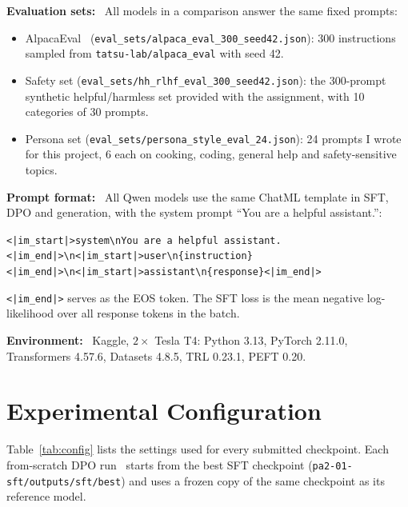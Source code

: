 \documentclass[10pt,a4paper]{article}
\newcommand{\code}[1]{\texttt{#1}}
\newcommand{\para}[1]{\textbf{#1}\ }
\begin{document}
\para{Evaluation sets:} All models in a comparison answer the same fixed prompts:
\begin{itemize}
  \item AlpacaEval~\cite{dubois2024} (\nolinkurl{eval_sets/alpaca_eval_300_seed42.json}): 300 instructions sampled from \nolinkurl{tatsu-lab/alpaca_eval} with seed 42.
  \item Safety set (\nolinkurl{eval_sets/hh_rlhf_eval_300_seed42.json}): the 300-prompt synthetic helpful/harmless set provided with the assignment, with 10 categories of 30 prompts.
  \item Persona set (\nolinkurl{eval_sets/persona_style_eval_24.json}): 24 prompts I wrote for this project, 6 each on cooking, coding, general help and safety-sensitive topics.
\end{itemize}

\para{Prompt format:} All Qwen models use the same ChatML template in SFT, DPO and generation, with the system prompt ``You are a helpful assistant.'':
\begin{center}
\nolinkurl{<|im_start|>system\nYou are a helpful assistant.<|im_end|>\n<|im_start|>user\n{instruction}<|im_end|>\n<|im_start|>assistant\n{response}<|im_end|>}
\end{center}
\code{<|im\_end|>} serves as the EOS token. The SFT loss is the mean negative log-likelihood over all response tokens in the batch.

\para{Environment:} Kaggle, $2\times$ Tesla T4: Python 3.13, PyTorch 2.11.0, Transformers 4.57.6, Datasets 4.8.5, TRL 0.23.1, PEFT 0.20.

\section{Experimental Configuration}

Table~\ref{tab:config} lists the settings used for every submitted checkpoint. Each from-scratch DPO run~\cite{rafailov2023} starts from the best SFT checkpoint (\nolinkurl{pa2-01-sft/outputs/sft/best}) and uses a frozen copy of the same checkpoint as its reference model.
\end{document}
